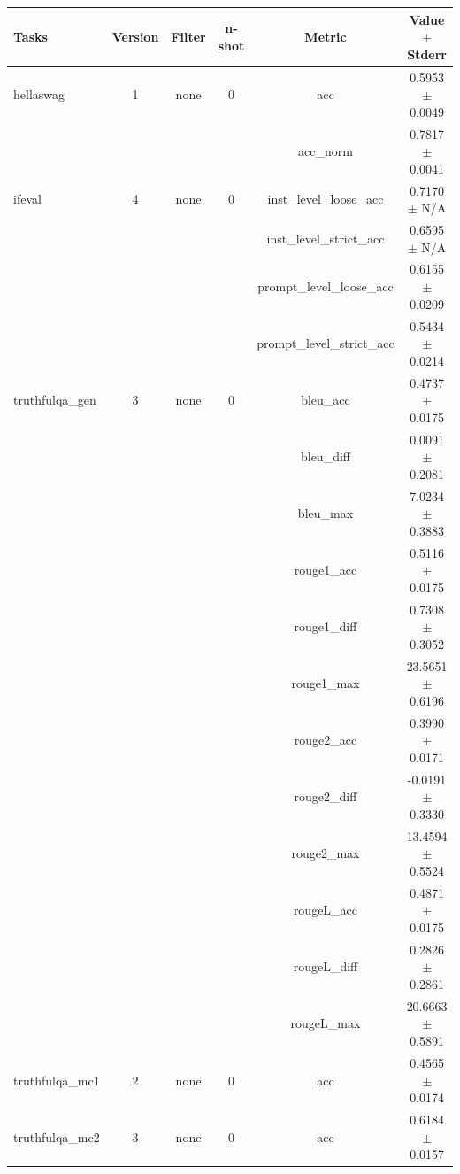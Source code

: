 \documentclass{ifacconf}
\begin{document}
\begin{minipage}{\textwidth}
		\begin{table}[H]
			\centering
			\begin{tabular}{|l|c|c|c|c|c|}
				\hline
				\textbf{Tasks} & \textbf{Version} & \textbf{Filter} & \textbf{n-shot} & \textbf{Metric} & \textbf{Value} $\pm$ \textbf{Stderr} \\ \hline
				hellaswag & 1 & none & 0 & acc & 0.5953 $\pm$ 0.0049 \\ \hline
				& & & & acc\_norm & 0.7817 $\pm$ 0.0041 \\ \hline
				ifeval & 4 & none & 0 & inst\_level\_loose\_acc & 0.7170 $\pm$ N/A \\ \hline
				& & & & inst\_level\_strict\_acc & 0.6595 $\pm$ N/A \\ \hline
				& & & & prompt\_level\_loose\_acc & 0.6155 $\pm$ 0.0209 \\ \hline
				& & & & prompt\_level\_strict\_acc & 0.5434 $\pm$ 0.0214 \\ \hline
				truthfulqa\_gen & 3 & none & 0 & bleu\_acc & 0.4737 $\pm$ 0.0175 \\ \hline
				& & & & bleu\_diff & 0.0091 $\pm$ 0.2081 \\ \hline
				& & & & bleu\_max & 7.0234 $\pm$ 0.3883 \\ \hline
				& & & & rouge1\_acc & 0.5116 $\pm$ 0.0175 \\ \hline
				& & & & rouge1\_diff & 0.7308 $\pm$ 0.3052 \\ \hline
				& & & & rouge1\_max & 23.5651 $\pm$ 0.6196 \\ \hline
				& & & & rouge2\_acc & 0.3990 $\pm$ 0.0171 \\ \hline
				& & & & rouge2\_diff & -0.0191 $\pm$ 0.3330 \\ \hline
				& & & & rouge2\_max & 13.4594 $\pm$ 0.5524 \\ \hline
				& & & & rougeL\_acc & 0.4871 $\pm$ 0.0175 \\ \hline
				& & & & rougeL\_diff & 0.2826 $\pm$ 0.2861 \\ \hline
				& & & & rougeL\_max & 20.6663 $\pm$ 0.5891 \\ \hline
				truthfulqa\_mc1 & 2 & none & 0 & acc & 0.4565 $\pm$ 0.0174 \\ \hline
				truthfulqa\_mc2 & 3 & none & 0 & acc & 0.6184 $\pm$ 0.0157 \\ \hline
			\end{tabular}
			\label{tab:qwen25_vptq}
		\end{table}
	\end{minipage}
	
\end{document}
